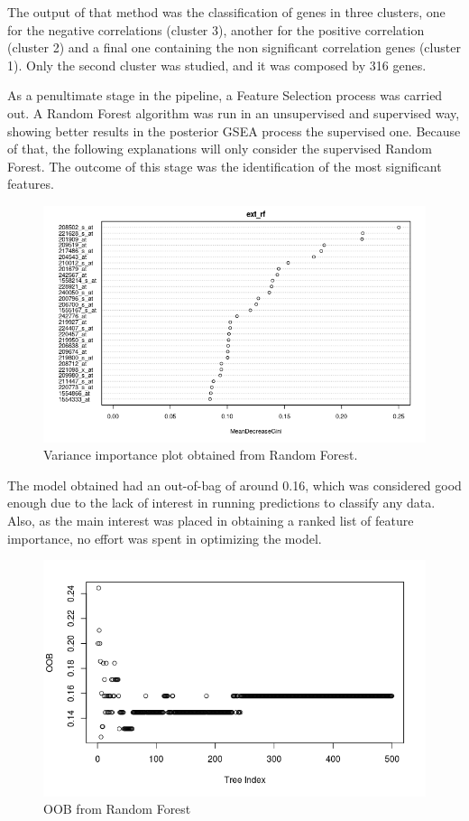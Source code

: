 The output of that method was the classification of genes in three clusters, one for the negative correlations (cluster 3), another for the positive correlation (cluster 2) and a final one containing the non significant correlation genes (cluster 1). Only the second cluster was studied, and it was composed by 316 genes.

As a penultimate stage in the pipeline, a Feature Selection process was carried out. A Random Forest algorithm was run in an unsupervised and supervised way, showing better results in the posterior GSEA process the supervised one. Because of that, the following explanations will only consider the supervised Random Forest. The outcome of this stage was the identification of the most significant features.

\begin{figure}[h!]
    \centering
    \includegraphics[scale=0.75]{../figs/varImpPlot.png}
    \caption{Variance importance plot obtained from Random Forest.}
    \label{fig:varImpPlot}    
\end{figure}

The model obtained had an out-of-bag of around 0.16, which was considered good enough due to the lack of interest in running predictions to classify any data.
Also, as the main interest was placed in obtaining a ranked list of feature importance, no effort was spent in optimizing the model.

\begin{figure}[h!]
    \centering
    \includegraphics[scale=0.75]{../figs/oob_RF.png}
    \caption{OOB from Random Forest}
    \label{fig:oob_rf}    
\end{figure}

